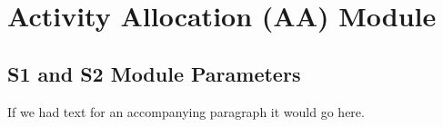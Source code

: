 \documentclass[letter,11pt]{book}
\begin{document}
\fontsize{12}{14.5}\rm

\setcounter{page}{131}
\setcounter{chapter}{5}
\chapter{Activity Allocation (AA) Module}
\setcounter{section}{4}
\section{S1 and S2 Module Parameters}

\renewcommand{\arraystretch}{0.96}
\afterpage{}

If we had text for an accompanying paragraph it would go here.
\end{document}
